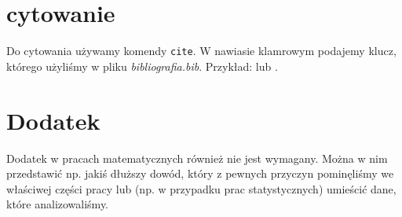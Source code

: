 \documentclass[inzynierska]{pwr_wmat_praca_dyplomowa}
\theoremstyle{plain}
\numberwithin{theorem}{chapter}
\theoremstyle{definition}
\numberwithin{theorem}{chapter}
\begin{document}
\chapter{cytowanie}
Do cytowania używamy komendy \texttt{cite}. W nawiasie klamrowym podajemy klucz, którego użyliśmy w pliku \emph{bibliografia.bib}. Przykład: \cite{einstein} lub \cite[chap. 2]{latexcompanion}.


{\backmatter \chapter{Dodatek}}
Dodatek w pracach matematycznych również nie jest wymagany. Można w nim przedstawić np. jakiś dłuższy dowód, który z pewnych przyczyn pominęliśmy we właściwej części pracy lub (np. w przypadku prac statystycznych) umieścić dane, które analizowaliśmy.

\newpage
 
\end{document}
